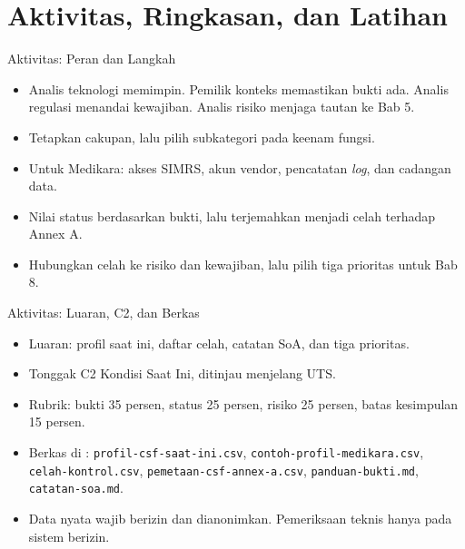 \documentclass[aspectratio=169, table, 12pt]{beamer}
\begin{document}
\section{Aktivitas, Ringkasan, dan Latihan}

\begin{frame}{{\Large Aktivitas: Peran dan Langkah}}
  \vspace{6pt}
  \small
  \begin{itemize}
    \item Analis teknologi memimpin. Pemilik konteks memastikan bukti ada. Analis regulasi menandai
          kewajiban. Analis risiko menjaga tautan ke Bab 5.
    \item Tetapkan cakupan, lalu pilih subkategori pada keenam fungsi.
    \item Untuk Medikara: akses SIMRS, akun vendor, pencatatan \textit{log}, dan cadangan data.
    \item Nilai status berdasarkan bukti, lalu terjemahkan menjadi celah terhadap Annex A.
    \item Hubungkan celah ke risiko dan kewajiban, lalu pilih tiga prioritas untuk Bab 8.
  \end{itemize}
\end{frame}

\begin{frame}{{\Large Aktivitas: Luaran, C2, dan Berkas}}
  \vspace{6pt}
  \small
  \begin{itemize}
    \item Luaran: profil saat ini, daftar celah, catatan SoA, dan tiga prioritas.
    \item Tonggak C2 Kondisi Saat Ini, ditinjau menjelang UTS.
    \item Rubrik: bukti 35 persen, status 25 persen, risiko 25 persen, batas kesimpulan 15 persen.
    \item Berkas di : \texttt{profil-csf-saat-ini.csv},
          \texttt{contoh-profil-medikara.csv}, \texttt{celah-kontrol.csv},
          \texttt{pemetaan-csf-annex-a.csv}, \texttt{panduan-bukti.md}, \texttt{catatan-soa.md}.
    \item Data nyata wajib berizin dan dianonimkan. Pemeriksaan teknis hanya pada sistem berizin.
  \end{itemize}
\end{frame}
\end{document}

